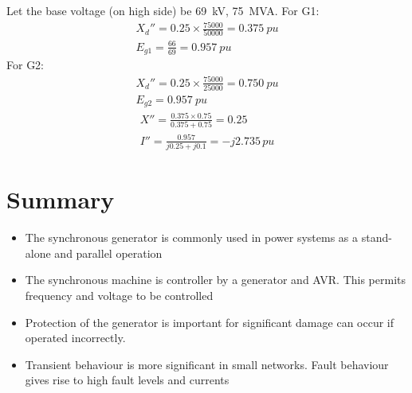 Let the base voltage (on high side) be \SI{69}{\kilo\volt}, \SI{75}{MVA}. For G1:
\begin{gather}
    X_d'' = 0.25\times \frac{75000}{50000} = \SI{0.375}{pu}\\
    E_{g1} = \frac{66}{69} = \SI{0.957}{pu}
\end{gather}
For G2:
\begin{gather}
    X_d'' = 0.25\times \frac{75000}{25000} = \SI{0.750}{pu}\\
    E_{g2} = \SI{0.957}{pu}
\end{gather}
\begin{gather}
    X'' = \frac{0.375 \times 0.75}{0.375 + 0.75} = 0.25\\
    I'' = \frac{0.957}{j0.25 + j0.1} = -j2.735 \, \si{pu}
\end{gather}
\section{Summary}
\begin{itemize}
    \item The synchronous generator is commonly used in power systems as a stand-alone and parallel operation
    \item The synchronous machine is controller by a generator and AVR. This permits frequency and voltage to be controlled
    \item Protection of the generator is important for significant damage can occur if operated incorrectly.
    \item Transient behaviour is more significant in small networks. Fault behaviour gives rise to high fault levels and currents
\end{itemize}